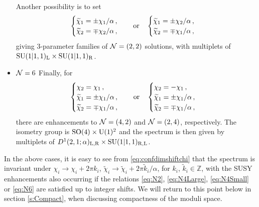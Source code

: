 \documentclass[a4paper, 11pt]{article}
\numberwithin{equation}{section}
\newcommand{\ts}[1]{\widetilde{#1}}
\newcommand{\SU}[1]{\mathrm{SU}( #1 )}
\newcommand{\SO}[1]{\mathrm{SO}( #1 )}
\newcommand{\+}{\oplus}
\begin{document}
\begin{itemize}
	Another possibility is to set
	\begin{equation} \label{eq:N4Small}
		\begin{cases}
			\ts{\chi}_{1} = \pm \chi_{1}/\alpha\,,\\%
			\ts{\chi}_{2} = \mp \chi_{2}/\alpha\,,%
		\end{cases}
		\quad {\rm or}\quad
		\begin{cases}
			\ts{\chi}_{1} = \pm \chi_{2}/\alpha\,,\\%
			\ts{\chi}_{2} = \mp \chi_{1}/\alpha\,,%
		\end{cases}%
	\end{equation}
	giving 3-parameter families of ${\cal N}=(2,2)$ solutions, with multiplets of $\SU{1\vert1,1}_{\rm L}\times\SU{1\vert1,1}_{\rm R}$.
	\item {\boldmath ${\cal N}=6$} Finally, for
	\begin{equation} \label{eq:N6}
		\begin{cases}
			\chi_{2} = \chi_{1}\,,\\%
			\ts{\chi}_{1} = %
			\pm \chi_{1}%
			/\alpha\,,\\
			\ts{\chi}_{2} = %
			\mp \chi_{1}%
			/\alpha\,,
		\end{cases}
		\quad {\rm or}\quad
		\begin{cases}
			\chi_{2} = -\chi_{1}\,,\\%
			\ts{\chi}_{1} = %
			\pm \chi_{1}%
			/\alpha\,,\\
			\ts{\chi}_{2} = %
			\mp \chi_{1}%
			/\alpha\,,
		\end{cases}%
	\end{equation}
	there are enhancements to ${\cal N}=(4,2)$ and ${\cal N}=(2,4)$, respectively. The isometry group is $\SO{4}\times {\rm U}(1)^{2}$ and the spectrum is then given by multiplets of $D^{1}(2,1;\alpha)_{\rm L, R}\times\SU{1\vert1,1}_{\rm R,L}$.
\end{itemize}

In the above cases, it is easy to see from \eqref{eq:confdimshiftchi} that the spectrum  is invariant under $\chi_i \rightarrow \chi_i + 2\pi k_i$, $\ts{\chi}_i \rightarrow \ts{\chi}_i + 2\pi \ts{k}_i/\alpha$, for $k_i$, $\ts{k}_i \in \mathbb{Z}$, with the SUSY enhancements also occurring if the relations \eqref{eq:N2}, \eqref{eq:N4Large}, \eqref{eq:N4Small} or \eqref{eq:N6} are satisfied up to integer shifts. We will return to this point below in section \ref{s:Compact}, when discussing compactness of the moduli space.
\end{document}

